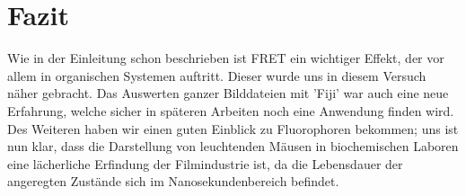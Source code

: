 

\chapter{Fazit}
\label{chap:fazit}
Wie in der Einleitung schon beschrieben ist FRET ein wichtiger Effekt, der vor allem in organischen Systemen auftritt. Dieser 
wurde uns in diesem Versuch näher gebracht. Das Auswerten ganzer Bilddateien mit 'Fiji' war auch eine neue Erfahrung, 
welche sicher in späteren Arbeiten noch eine Anwendung finden wird. Des Weiteren haben wir einen guten Einblick zu Fluorophoren bekommen; uns ist nun klar, dass
die Darstellung von leuchtenden Mäusen in biochemischen Laboren eine lächerliche Erfindung der Filmindustrie ist, da die Lebensdauer der angeregten 
Zustände sich im Nanosekundenbereich befindet. 

